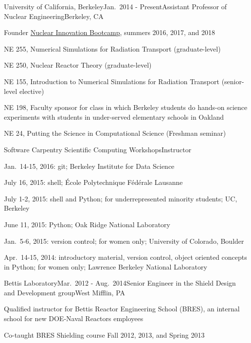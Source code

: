 \begin{rSubsection}{University of California, Berkeley}{Jan.\ 2014 - Present}{Assistant Professor of Nuclear Engineering}{Berkeley, CA}
\item Founder \href{http://nuclearinnovationalliance.org/bootcamp}{Nuclear Innovation Bootcamp}, summers 2016, 2017, and 2018
\item NE 255, Numerical Simulations for Radiation Transport (graduate-level)
\item NE 250, Nuclear Reactor Theory (graduate-level)
\item NE 155, Introduction to Numerical Simulations for Radiation Transport (senior-level elective)
\item NE 198, Faculty sponsor for class in which Berkeley students do hands-on science experiments with students in under-served elementary schools in Oakland
\item NE 24, Putting the Science in Computational Science (Freshman seminar)
\end{rSubsection}


\begin{rSubsection}{Software Carpentry Scientific Computing Workshops}{}{Instructor}{}
\item Jan.\ 14-15, 2016: git; Berkeley Institute for Data Science
\item July 16, 2015: shell; \'{E}cole Polytechnique F\'{e}d\'{e}rale Lausanne
\item July 1-2, 2015: shell and Python; for underrepresented minority students; UC, Berkeley
\item June 11, 2015: Python; Oak Ridge National Laboratory
\item Jan.\ 5-6, 2015: version control; for women only; University of Colorado, Boulder
\item Apr.\ 14-15, 2014: introductory material, version control, object oriented concepts in Python; for women only; Lawrence Berkeley National Laboratory
\end{rSubsection}



\begin{rSubsection}{Bettis Laboratory}{Mar.\ 2012 - Aug.\ 2014}{Senior Engineer in the Shield Design and Development group}{West Mifflin, PA}
\item Qualified instructor for Bettis Reactor Engineering School (BRES), an internal school for new DOE-Naval Reactors employees
\item Co-taught BRES Shielding course Fall 2012, 2013, and Spring 2013
\end{rSubsection}

